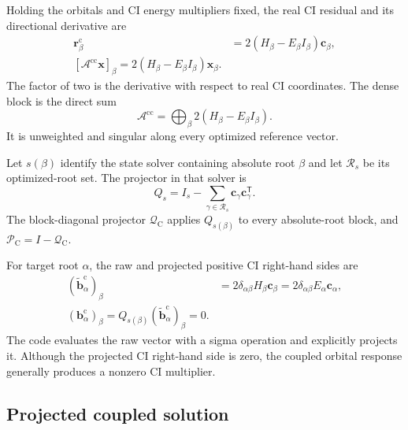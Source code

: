 \documentclass[aip,preprint,nofootinbib]{revtex4-1}
\begin{document}
Holding the orbitals and CI energy multipliers fixed, the real CI residual and
its directional derivative are
\begin{align}
 \mathbf r^\mathrm{c}_\beta
 &=2(H_\beta-E_\beta I_\beta)\mathbf c_\beta,
 \\
 \boxed{
 [\mathcal A^{\mathrm{cc}}\mathbf x]_\beta
 =2(H_\beta-E_\beta I_\beta)\mathbf x_\beta
 }.
 \label{eq:nr-cc-action}
\end{align}
The factor of two is the derivative with respect to real CI coordinates.
The dense block is the direct sum
\begin{equation}
 \mathcal A^{\mathrm{cc}}
 =\bigoplus_\beta2(H_\beta-E_\beta I_\beta).
\end{equation}
It is unweighted and singular along every optimized reference vector.

Let $s(\beta)$ identify the state solver containing absolute root $\beta$ and
let $\mathcal R_s$ be its optimized-root set.  The projector in that solver is
\begin{equation}
 Q_s=I_s-\sum_{\gamma\in\mathcal R_s}
 \mathbf c_\gamma\mathbf c_\gamma^{\mathsf T}.
 \label{eq:nr-ci-projector}
\end{equation}
The block-diagonal projector $\mathcal Q_{\mathrm C}$ applies $Q_{s(\beta)}$
to every absolute-root block, and
$\mathcal P_{\mathrm C}=I-\mathcal Q_{\mathrm C}$.

For target root $\alpha$, the raw and projected positive CI right-hand sides
are
\begin{align}
 (\widetilde{\mathbf b}^{\mathrm c}_\alpha)_\beta
 &=2\delta_{\alpha\beta}H_\beta\mathbf c_\beta
 =2\delta_{\alpha\beta}E_\alpha\mathbf c_\alpha,
 \\
 \boxed{
 (\mathbf b^{\mathrm c}_\alpha)_\beta
 =Q_{s(\beta)}(\widetilde{\mathbf b}^{\mathrm c}_\alpha)_\beta=0
 }.
 \label{eq:nr-ci-b}
\end{align}
The code evaluates the raw vector with a sigma operation and explicitly
projects it.  Although the projected CI right-hand side is zero, the coupled
orbital response generally produces a nonzero CI multiplier.

\subsection{Projected coupled solution}
\end{document}
